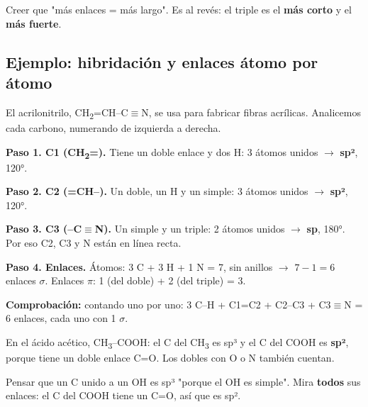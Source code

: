 \begin{ojo} Creer que "más enlaces = más largo". Es al revés: el triple es el \textbf{más corto} y el \textbf{más fuerte}.\end{ojo}
\subsection{Ejemplo: hibridación y enlaces átomo por átomo}
El acrilonitrilo, CH\textsubscript{2}=CH--C\ensuremath{\equiv}N, se usa para fabricar fibras acrílicas. Analicemos cada carbono, numerando de izquierda a derecha.

 

\textbf{Paso 1. C1 (CH\textsubscript{2}=).} Tiene un doble enlace y dos H: 3 átomos unidos \ensuremath{\rightarrow} \textbf{sp²}, 120°.

 

\textbf{Paso 2. C2 (=CH--).} Un doble, un H y un simple: 3 átomos unidos \ensuremath{\rightarrow} \textbf{sp²}, 120°.

 

\textbf{Paso 3. C3 (--C\ensuremath{\equiv}N).} Un simple y un triple: 2 átomos unidos \ensuremath{\rightarrow} \textbf{sp}, 180°. Por eso C2, C3 y N están en línea recta.

 

\textbf{Paso 4. Enlaces.} Átomos: 3 C + 3 H + 1 N = 7, sin anillos \ensuremath{\rightarrow} $7 - 1 = 6$ enlaces $\sigma$. Enlaces $\pi$: 1 (del doble) + 2 (del triple) = 3.

 

\textbf{Comprobación:} contando uno por uno: 3 C--H + C1=C2 + C2--C3 + C3\ensuremath{\equiv}N = 6 enlaces, cada uno con 1 $\sigma$. 

  
\begin{clave} En el ácido acético, CH\textsubscript{3}--COOH: el C del CH\textsubscript{3} es sp³ y el C del COOH es \textbf{sp²}, porque tiene un doble enlace C=O. Los dobles con O o N también cuentan.\end{clave}
 
\begin{ojo} Pensar que un C unido a un OH es sp³ "porque el OH es simple". Mira \textbf{todos} sus enlaces: el C del COOH tiene un C=O, así que es sp².\end{ojo}

